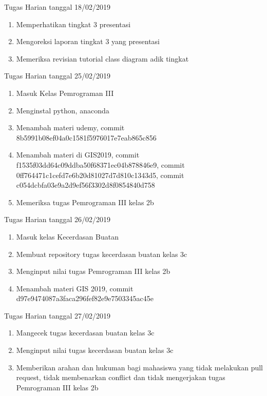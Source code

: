 Tugas Harian tanggal 18/02/2019
\begin{enumerate}
\item Memperhatikan tingkat 3 presentasi
\item Mengoreksi laporan tingkat 3 yang presentasi
\item Memeriksa revisian tutorial class diagram adik tingkat
\end{enumerate}

Tugas Harian tanggal 25/02/2019
\begin{enumerate}
\item Masuk Kelas Pemrograman III
\item Menginstal python, anaconda
\item Menambah materi udemy, commit 8b5991b08ef04a0c1581f5976017e7eab865c856
\item Menambah materi di GIS2019, commit f1535f03dd64c09ddba50f68371ec04b878846e9, commit 0ff764471c1cefd7e6b20d81027d7d810c1343d5, commit c054dcbfa03e9a2d9ef56f3302d8f0854840d758
\item Memeriksa tugas Pemrograman III kelas 2b 
\end{enumerate}

Tugas Harian tanggal 26/02/2019
\begin{enumerate}
\item Masuk kelas Kecerdasan Buatan
\item Membuat repository tugas kecerdasan buatan kelas 3c
\item Menginput nilai tugas Pemrograman III kelas 2b
\item Menambah materi GIS 2019, commit d97e9474087a3faca296fef82e9e7503345ac45e
\end{enumerate}

Tugas Harian tanggal 27/02/2019
\begin{enumerate}
\item Mangecek tugas kecerdasan buatan kelas 3c
\item Menginput nilai tugas kecerdasan buatan kelas 3c
\item Memberikan arahan dan hukuman bagi mahasiswa yang tidak melakukan pull request, tidak membenarkan conflict dan tidak mengerjakan tugas Pemrograman III kelas 2b
\end{enumerate}





